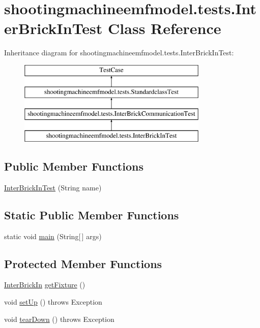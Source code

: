 \hypertarget{classshootingmachineemfmodel_1_1tests_1_1_inter_brick_in_test}{\section{shootingmachineemfmodel.\-tests.\-Inter\-Brick\-In\-Test Class Reference}
\label{classshootingmachineemfmodel_1_1tests_1_1_inter_brick_in_test}
}
Inheritance diagram for shootingmachineemfmodel.\-tests.\-Inter\-Brick\-In\-Test\-:\begin{figure}[H]
\begin{center}
\leavevmode
\includegraphics[height=4.000000cm]{classshootingmachineemfmodel_1_1tests_1_1_inter_brick_in_test}
\end{center}
\end{figure}
\subsection*{Public Member Functions}
\begin{DoxyCompactItemize}
\item 
\hyperlink{classshootingmachineemfmodel_1_1tests_1_1_inter_brick_in_test_a502f48d4228d88678abae4d7a2b95525}{Inter\-Brick\-In\-Test} (String name)
\end{DoxyCompactItemize}
\subsection*{Static Public Member Functions}
\begin{DoxyCompactItemize}
\item 
static void \hyperlink{classshootingmachineemfmodel_1_1tests_1_1_inter_brick_in_test_a6dcf33358c8324acde60a3b3ce2717ff}{main} (String\mbox{[}$\,$\mbox{]} args)
\end{DoxyCompactItemize}
\subsection*{Protected Member Functions}
\begin{DoxyCompactItemize}
\item 
\hyperlink{interfaceshootingmachineemfmodel_1_1_inter_brick_in}{Inter\-Brick\-In} \hyperlink{classshootingmachineemfmodel_1_1tests_1_1_inter_brick_in_test_acccbd603f032f428b005d3c04435e0ca}{get\-Fixture} ()
\item 
void \hyperlink{classshootingmachineemfmodel_1_1tests_1_1_inter_brick_in_test_a7a7db5c5840b35aa2eff05e3c402a87a}{set\-Up} ()  throws Exception 
\item 
void \hyperlink{classshootingmachineemfmodel_1_1tests_1_1_inter_brick_in_test_ad3be8afedef46c75b4f8d7991b80da8b}{tear\-Down} ()  throws Exception 
\end{DoxyCompactItemize}
